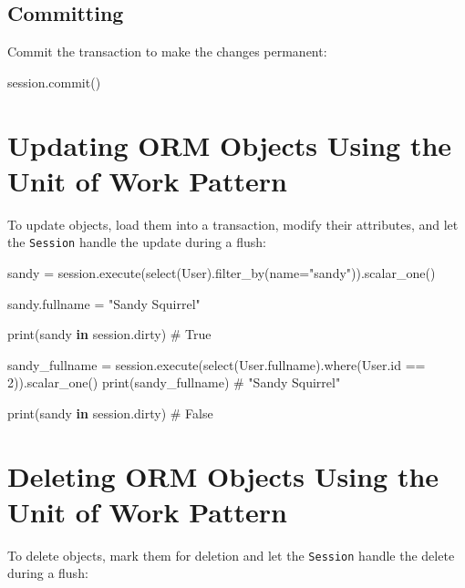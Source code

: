 \documentclass[
  letterpaper,
  DIV=11,
  numbers=noendperiod]{scrreprt}
\newenvironment{Shaded}{\begin{snugshade}}{\end{snugshade}}
\newcommand{\BuiltInTok}[1]{\textcolor[rgb]{0.00,0.23,0.31}{#1}}
\newcommand{\CommentTok}[1]{\textcolor[rgb]{0.37,0.37,0.37}{#1}}
\newcommand{\DecValTok}[1]{\textcolor[rgb]{0.68,0.00,0.00}{#1}}
\newcommand{\KeywordTok}[1]{\textcolor[rgb]{0.00,0.23,0.31}{\textbf{#1}}}
\newcommand{\NormalTok}[1]{\textcolor[rgb]{0.00,0.23,0.31}{#1}}
\newcommand{\OperatorTok}[1]{\textcolor[rgb]{0.37,0.37,0.37}{#1}}
\newcommand{\StringTok}[1]{\textcolor[rgb]{0.13,0.47,0.30}{#1}}
\begin{document}
\subsection{Committing}\label{committing}

Commit the transaction to make the changes permanent:

\begin{Shaded}
\begin{Highlighting}[]
\NormalTok{session.commit()}
\end{Highlighting}
\end{Shaded}

\section{Updating ORM Objects Using the Unit of Work
Pattern}\label{updating-orm-objects-using-the-unit-of-work-pattern}

To update objects, load them into a transaction, modify their
attributes, and let the \texttt{Session} handle the update during a
flush:

\begin{Shaded}
\begin{Highlighting}[]
\NormalTok{sandy }\OperatorTok{=}\NormalTok{ session.execute(select(User).filter\_by(name}\OperatorTok{=}\StringTok{"sandy"}\NormalTok{)).scalar\_one()}

\NormalTok{sandy.fullname }\OperatorTok{=} \StringTok{"Sandy Squirrel"}

\BuiltInTok{print}\NormalTok{(sandy }\KeywordTok{in}\NormalTok{ session.dirty)  }\CommentTok{\# True}

\NormalTok{sandy\_fullname }\OperatorTok{=}\NormalTok{ session.execute(select(User.fullname).where(User.}\BuiltInTok{id} \OperatorTok{==} \DecValTok{2}\NormalTok{)).scalar\_one()}
\BuiltInTok{print}\NormalTok{(sandy\_fullname)  }\CommentTok{\# "Sandy Squirrel"}

\BuiltInTok{print}\NormalTok{(sandy }\KeywordTok{in}\NormalTok{ session.dirty)  }\CommentTok{\# False}
\end{Highlighting}
\end{Shaded}

\section{Deleting ORM Objects Using the Unit of Work
Pattern}\label{deleting-orm-objects-using-the-unit-of-work-pattern}

To delete objects, mark them for deletion and let the \texttt{Session}
handle the delete during a flush:
\end{document}
